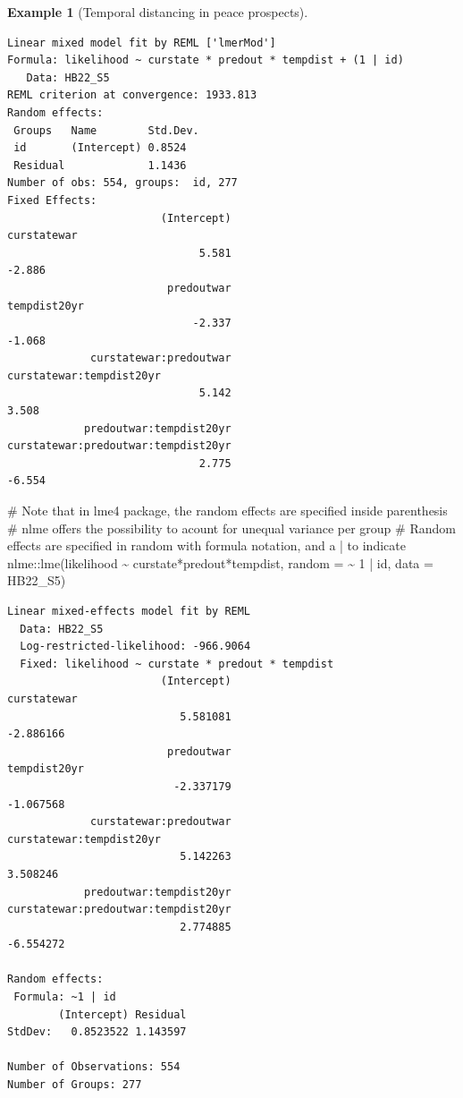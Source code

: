 \documentclass[
  11pt,
  letterpaper,
]{scrbook}
\newenvironment{Shaded}{\begin{snugshade}}{\end{snugshade}}
\newcommand{\AttributeTok}[1]{\textcolor[rgb]{0.40,0.45,0.13}{#1}}
\newcommand{\CommentTok}[1]{\textcolor[rgb]{0.37,0.37,0.37}{#1}}
\newcommand{\DecValTok}[1]{\textcolor[rgb]{0.68,0.00,0.00}{#1}}
\newcommand{\FunctionTok}[1]{\textcolor[rgb]{0.28,0.35,0.67}{#1}}
\newcommand{\NormalTok}[1]{\textcolor[rgb]{0.00,0.23,0.31}{#1}}
\newcommand{\SpecialCharTok}[1]{\textcolor[rgb]{0.37,0.37,0.37}{#1}}
\theoremstyle{definition}
\newtheorem{example}{Example}[chapter]
\theoremstyle{remark}
\begin{document}
\begin{example}[Temporal distancing in peace
prospects]
\begin{verbatim}
Linear mixed model fit by REML ['lmerMod']
Formula: likelihood ~ curstate * predout * tempdist + (1 | id)
   Data: HB22_S5
REML criterion at convergence: 1933.813
Random effects:
 Groups   Name        Std.Dev.
 id       (Intercept) 0.8524  
 Residual             1.1436  
Number of obs: 554, groups:  id, 277
Fixed Effects:
                        (Intercept)                          curstatewar  
                              5.581                               -2.886  
                         predoutwar                         tempdist20yr  
                             -2.337                               -1.068  
             curstatewar:predoutwar             curstatewar:tempdist20yr  
                              5.142                                3.508  
            predoutwar:tempdist20yr  curstatewar:predoutwar:tempdist20yr  
                              2.775                               -6.554  
\end{verbatim}

\begin{Shaded}
\begin{Highlighting}[]
\CommentTok{\#  Note that in \textasciigrave{}lme4\textasciigrave{} package, the random effects are specified inside parenthesis}
\CommentTok{\# nlme offers the possibility to acount for unequal variance per group}
\CommentTok{\# Random effects are specified in \textasciigrave{}random\textasciigrave{} with formula notation, and a | to indicate}
\NormalTok{nlme}\SpecialCharTok{::}\FunctionTok{lme}\NormalTok{(likelihood }\SpecialCharTok{\textasciitilde{}}\NormalTok{ curstate}\SpecialCharTok{*}\NormalTok{predout}\SpecialCharTok{*}\NormalTok{tempdist, }\AttributeTok{random =} \SpecialCharTok{\textasciitilde{}} \DecValTok{1} \SpecialCharTok{|}\NormalTok{ id, }\AttributeTok{data =}\NormalTok{ HB22\_S5)}
\end{Highlighting}
\end{Shaded}

\begin{verbatim}
Linear mixed-effects model fit by REML
  Data: HB22_S5 
  Log-restricted-likelihood: -966.9064
  Fixed: likelihood ~ curstate * predout * tempdist 
                        (Intercept)                         curstatewar 
                           5.581081                           -2.886166 
                         predoutwar                        tempdist20yr 
                          -2.337179                           -1.067568 
             curstatewar:predoutwar            curstatewar:tempdist20yr 
                           5.142263                            3.508246 
            predoutwar:tempdist20yr curstatewar:predoutwar:tempdist20yr 
                           2.774885                           -6.554272 

Random effects:
 Formula: ~1 | id
        (Intercept) Residual
StdDev:   0.8523522 1.143597

Number of Observations: 554
Number of Groups: 277 
\end{verbatim}

\end{example}
\end{document}
